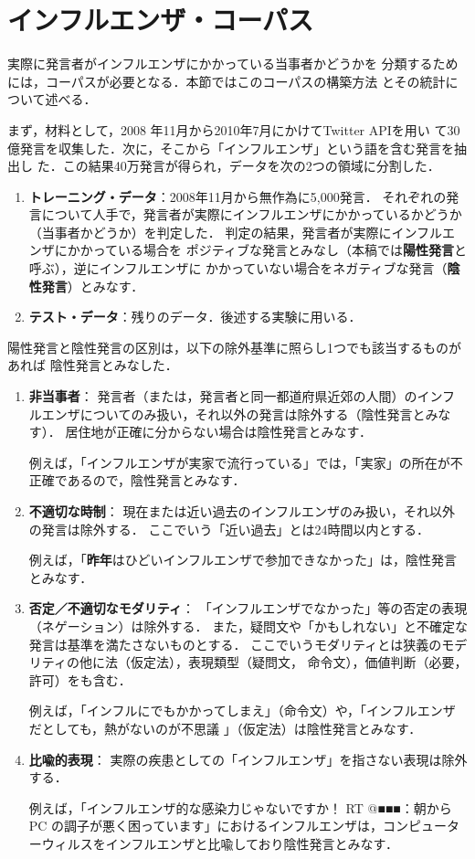 \documentclass[japanese]{jnlp_1.4}
\begin{document}
\section{インフルエンザ・コーパス}

実際に発言者がインフルエンザにかかっている当事者かどうかを
分類するためには，コーパスが必要となる．本節ではこのコーパスの構築方法
とその統計について述べる．

まず，材料として，2008 年11月から2010年7月にかけてTwitter APIを用い
て30億発言を収集した．次に，そこから「インフルエンザ」という語を含む発言を抽出し
た．この結果40万発言が得られ，データを次の2つの領域に分割した．
\begin{enumerate}
\item {\bf トレーニング・データ}：2008年11月から無作為に5,000発言．
それぞれの発言について人手で，発言者が実際にインフルエンザにかかっているかどうか（当事者かどうか）を判定した．
判定の結果，発言者が実際にインフルエンザにかかっている場合を
ポジティブな発言とみなし（本稿では{\bf 陽性発言}と呼ぶ），逆にインフルエンザに
かかっていない場合をネガティブな発言（{\bf 陰性発言}）とみなす．

\item {\bf テスト・データ}：残りのデータ．後述する実験に用いる．
\end{enumerate}


陽性発言と陰性発言の区別は，以下の除外基準に照らし1つでも該当するものがあれば
陰性発言とみなした．
\begin{enumerate}
\item {\bf 非当事者}：
発言者（または，発言者と同一都道府県近郊の人間）のインフルエンザについてのみ扱い，それ以外の発言は除外する（陰性発言とみなす）．
居住地が正確に分からない場合は陰性発言とみなす． 

例えば，「インフルエンザが実家で流行っている」では，「実家」の所在が不正確であるので，陰性発言とみなす．
\item {\bf 不適切な時制}：
現在または近い過去のインフルエンザのみ扱い，それ以外の発言は除外する．
ここでいう「近い過去」とは24時間以内とする．

例えば，「{\bf 昨年}はひどいインフルエンザで参加できなかった」は，陰性発言とみなす．

\item {\bf 否定／不適切なモダリティ}：
「インフルエンザでなかった」等の否定の表現（ネゲーション）は除外する．
  また，疑問文や「かもしれない」と不確定な発言は基準を満たさないものとする．
  ここでいうモダリティとは狭義のモデリティの他に法（仮定法），表現類型（疑問文，
  命令文），価値判断（必要，許可）をも含む．

例えば，「インフルにでもかかってしまえ」（命令文）や，「インフルエンザだとしても，熱がないのが不思議 」（仮定法）は陰性発言とみなす．
\item {\bf 比喩的表現}：
  実際の疾患としての「インフルエンザ」を指さない表現は除外する．

  例えば，「インフルエンザ的な感染力じゃないですか！ RT @■■■：朝から PC の調子が悪く困っています」におけるインフルエンザは，コンピューターウィルスをインフルエンザと比喩しており陰性発言とみなす．
\end{enumerate}
\end{document}
